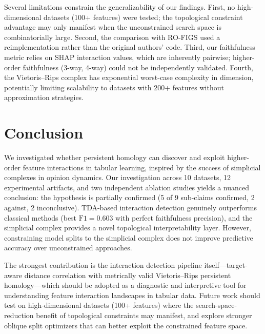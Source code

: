 \documentclass[11pt,letterpaper]{article}
\begin{document}
Several limitations constrain the generalizability of our findings. First, no high-dimensional datasets (100+ features) were tested; the topological constraint advantage may only manifest when the unconstrained search space is combinatorially large. Second, the comparison with RO-FIGS used a reimplementation rather than the original authors' code. Third, our faithfulness metric relies on SHAP interaction values, which are inherently pairwise; higher-order faithfulness (3-way, 4-way) could not be independently validated. Fourth, the Vietoris--Rips complex has exponential worst-case complexity in dimension, potentially limiting scalability to datasets with 200+ features without approximation strategies.

\section{Conclusion}
\label{sec:conclusion}

We investigated whether persistent homology can discover and exploit higher-order feature interactions in tabular learning, inspired by the success of simplicial complexes in opinion dynamics. Our investigation across 10 datasets, 12 experimental artifacts, and two independent ablation studies yields a nuanced conclusion: the hypothesis is partially confirmed (5 of 9 sub-claims confirmed, 2 against, 2 inconclusive). TDA-based interaction detection genuinely outperforms classical methods (best $\text{F1} = 0.603$ with perfect faithfulness precision), and the simplicial complex provides a novel topological interpretability layer. However, constraining model splits to the simplicial complex does not improve predictive accuracy over unconstrained approaches.

The strongest contribution is the interaction detection pipeline itself---target-aware distance correlation with metrically valid Vietoris--Rips persistent homology---which should be adopted as a diagnostic and interpretive tool for understanding feature interaction landscapes in tabular data. Future work should test on high-dimensional datasets (100+ features) where the search-space-reduction benefit of topological constraints may manifest, and explore stronger oblique split optimizers that can better exploit the constrained feature space.



\end{document}
